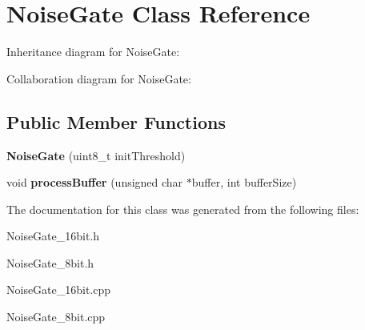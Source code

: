 \hypertarget{classNoiseGate}{}\section{Noise\+Gate Class Reference}
\label{classNoiseGate}


Inheritance diagram for Noise\+Gate\+:


Collaboration diagram for Noise\+Gate\+:
\subsection*{Public Member Functions}
\begin{DoxyCompactItemize}
\item 
\mbox{\label{classNoiseGate_a9a5aafbd238dbbc01eff52edd5ef29c4}} 
{\bfseries Noise\+Gate} (uint8\+\_\+t init\+Threshold)
\item 
\mbox{\label{classNoiseGate_a319f4b7d435ed4a270e695cf7c529d24}} 
void {\bfseries process\+Buffer} (unsigned char $\ast$buffer, int buffer\+Size)
\end{DoxyCompactItemize}


The documentation for this class was generated from the following files\+:\begin{DoxyCompactItemize}
\item 
Noise\+Gate\+\_\+16bit.\+h\item 
Noise\+Gate\+\_\+8bit.\+h\item 
Noise\+Gate\+\_\+16bit.\+cpp\item 
Noise\+Gate\+\_\+8bit.\+cpp\end{DoxyCompactItemize}
